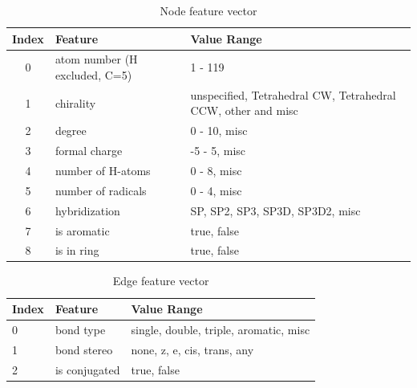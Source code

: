 \begin{table}
    \centering
    \caption{Node feature vector}
    \label{node_feature_list}
    \begin{tabular}{c || l| p{6cm} |}
        Index & Feature                       & Value Range                                                  \\
        \hline
        \hline
        0     & atom number (H excluded, C=5) & 1 - 119                                                      \\
        1     & chirality                     & unspecified, Tetrahedral CW, Tetrahedral CCW, other and misc \\
        2     & degree                        & 0 - 10, misc                                                 \\
        3     & formal charge                 & -5 - 5, misc                                                 \\
        4     & number of H-atoms             & 0 - 8, misc                                                  \\
        5     & number of radicals            & 0 - 4, misc                                                  \\
        6     & hybridization                 & SP, SP2, SP3, SP3D, SP3D2, misc                              \\
        7     & is aromatic                   & true, false                                                  \\
        8     & is in ring                    & true, false                                                  \\
    \end{tabular}
\end{table}

\begin{table}
    \centering
    \caption{Edge feature vector}
    \label{edge_features}
    \begin{tabular}{l || l p{6cm} |}
        Index & Feature       & Value Range                            \\
        \hline
        \hline
        0     & bond type     & single, double, triple, aromatic, misc \\
        1     & bond stereo   & none, z, e, cis, trans, any            \\
        2     & is conjugated & true, false
    \end{tabular}
\end{table}


